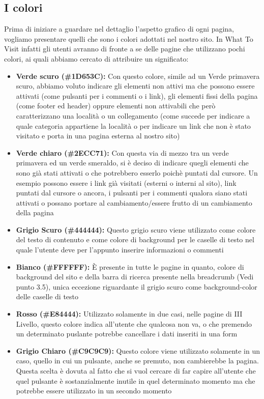 \subsection{I colori}
Prima di iniziare a guardare nel dettaglio l'aspetto grafico di ogni pagina, vogliamo presentare quelli che sono i colori adottati nel nostro sito. In What To Visit infatti gli utenti avranno di fronte a se delle pagine che utilizzano pochi colori, ai quali abbiamo cercato di attribuire un significato:
\begin{itemize}
\item \textbf{Verde scuro (\#1D653C):} Con questo colore, simile ad un Verde primavera scuro, abbiamo voluto indicare gli elementi non attivi ma che possono essere attivati (come pulsanti per i commenti o i link), gli elementi fissi della pagina (come footer ed header) oppure elementi non attivabili che però caratterizzano una località o un collegamento (come succede per indicare a quale categoria appartiene la località o per indicare un link che non è stato visitato e porta in una pagina esterna al nostro sito)
\item \textbf{Verde chiaro (\#2ECC71):} Con questa via di mezzo tra un verde primavera ed un verde smeraldo, si è deciso di indicare quegli elementi che sono già stati attivati o che potrebbero esserlo poichè puntati dal cursore. Un esempio possono essere i link già visitati (esterni o interni al sito), link puntati dal cursore o ancora, i pulsanti per i commenti qualora siano stati attivati o possano portare al cambiamento/essere frutto di un cambiamento della pagina
\item \textbf{Grigio Scuro (\#444444):} Questo grigio scuro viene utilizzato come colore del testo di contenuto e come colore di background per le caselle di testo nel quale l'utente deve per l'appunto inserire informazioni o commenti
\item \textbf{Bianco (\#FFFFFF):} È presente in tutte le pagine in quanto, colore di background del sito e della barra di ricerca presente nella breadcrumb (Vedi punto 3.5), unica eccezione riguardante il grigio scuro come background-color delle caselle di testo
\item \textbf{Rosso (\#E84444):} Utilizzato solamente in due casi, nelle pagine di III Livello, questo colore indica all'utente che qualcosa non va, o che premendo un determinato puslante potrebbe cancellare i dati inseriti in una form
\item \textbf{Grigio Chiaro (\#C9C9C9):} Questo colore viene utilizzato solamente in un caso, quello in cui un pulsante, anche se premuto, non cambierebbe la pagina. Questa scelta è dovuta al fatto che si vuol cercare di far capire all'utente che quel pulsante è sostanzialmente inutile in quel determinato momento ma che potrebbe essere utilizzato in un secondo momento
\end{itemize}

